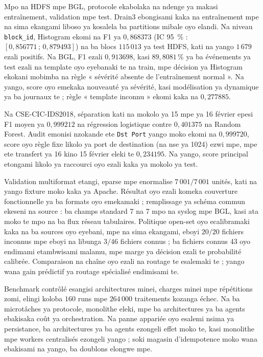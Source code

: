Mpo na HDFS mpe BGL, protocole ekabolaka na ndenge ya makasi entraînement,
validation mpe test. Drain3 ebongisami kaka na entraînement mpe na sima
ekangami liboso ya kosalela ba partitions mibale oyo elandi. Na niveau
\texttt{block\_id}, Histogram ekomi na F1 ya $0{,}868373$ (IC 95~\% :
$[0{,}856771\,;\,0{,}879493]$) na ba blocs $115\,013$ ya test HDFS,
kati na yango $1\,679$ ezali positifs. Na BGL, F1 ezali $0{,}913698$, kasi
$89{,}8081\,\%$ ya ba événements ya test ezali na template oyo eyebanaki
te na train, mpe décision ya Histogram ekokani mobimba na règle
« sévérité absente de l'entraînement normal ». Na yango, score oyo emekaka
nouveauté ya sévérité, kasi modélisation ya dynamique ya ba journaux te ;
règle « template inconnu » ekomi kaka na $0{,}277885$.

Na CSE-CIC-IDS2018, séparation kati na mokolo ya 15 mpe ya 16 février
epesi F1 moyen ya $0{,}999212$ na régression logistique contre
$0{,}401375$ na Random Forest. Audit emonisi nzokande ete
\texttt{Dst Port} yango moko ekomi na $0{,}999720$, score oyo règle fixe
likolo ya port de destination (na nse ya 1024) ezwi mpe, mpe ete transfert
ya 16 kino 15 février eleki te $0{,}234195$. Na yango, score principal
etongami likolo ya raccourci oyo ezali kaka ya mokolo ya test.

Validation multiformat etangi, eparse mpe enormalise
$7\,001/7\,001$ unités, kati na yango fixture moko kaka ya Apache.
Résultat oyo ezali komeka couverture fonctionnelle ya ba formats oyo
emekamaki ; remplissage ya schéma commun ekeseni na source : ba champs
standard 7 na 7 mpo na syslog mpe BGL, kasi ata moko te mpo na ba flux
réseau tabulaires. Politique open-set oyo ecalibramaki
kaka na ba sources oyo eyebani, mpe na sima ekangami, eboyi $20/20$
fichiers inconnus mpe eboyi na libunga $3/46$ fichiers connus ; ba fichiers
connus 43 oyo endimami etambwisami malamu, mpe marge ya décision ezali te
probabilité calibrée. Comparaison na chaîne oyo ezali na routage te
esalemaki te ; yango wana gain prédictif ya routage spécialisé endimisami te.

Benchmark contrôlé esangisi architectures minei, charges minei mpe
répétitions zomi, elingi koloba $160$ runs mpe $264\,000$ traitements
kozanga échec. Na ba microtâches ya protocole, monolithe eleki, mpe ba
architectures ya ba agents ebakisaka coût ya orchestration. Na panne
appariée oyo esalemi nsima ya persistance, ba architectures ya ba agents
ezongeli effet moko te, kasi monolithe mpe workers centralisés ezongeli
yango ; soki magasin d'idempotence moko wana ebakisami na yango, ba
doublons elongwe mpe.

